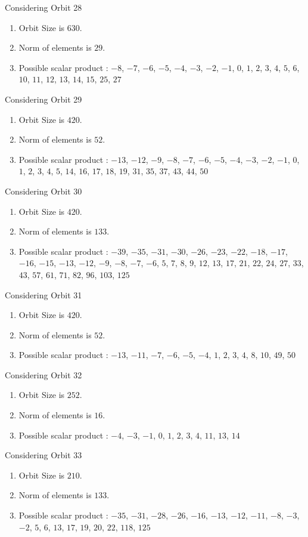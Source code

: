 \documentclass[12pt]{article}
\begin{document}
Considering Orbit 28
\begin{enumerate}
\item Orbit Size is $630$.
\item Norm of elements is $29$.
\item Possible scalar product : $-8$, $-7$, $-6$, $-5$, $-4$, $-3$, $-2$, $-1$, $0$, $1$, $2$, $3$, $4$, $5$, $6$, $10$, $11$, $12$, $13$, $14$, $15$, $25$, $27$
\end{enumerate}
Considering Orbit 29
\begin{enumerate}
\item Orbit Size is $420$.
\item Norm of elements is $52$.
\item Possible scalar product : $-13$, $-12$, $-9$, $-8$, $-7$, $-6$, $-5$, $-4$, $-3$, $-2$, $-1$, $0$, $1$, $2$, $3$, $4$, $5$, $14$, $16$, $17$, $18$, $19$, $31$, $35$, $37$, $43$, $44$, $50$
\end{enumerate}
Considering Orbit 30
\begin{enumerate}
\item Orbit Size is $420$.
\item Norm of elements is $133$.
\item Possible scalar product : $-39$, $-35$, $-31$, $-30$, $-26$, $-23$, $-22$, $-18$, $-17$, $-16$, $-15$, $-13$, $-12$, $-9$, $-8$, $-7$, $-6$, $5$, $7$, $8$, $9$, $12$, $13$, $17$, $21$, $22$, $24$, $27$, $33$, $43$, $57$, $61$, $71$, $82$, $96$, $103$, $125$
\end{enumerate}
Considering Orbit 31
\begin{enumerate}
\item Orbit Size is $420$.
\item Norm of elements is $52$.
\item Possible scalar product : $-13$, $-11$, $-7$, $-6$, $-5$, $-4$, $1$, $2$, $3$, $4$, $8$, $10$, $49$, $50$
\end{enumerate}
Considering Orbit 32
\begin{enumerate}
\item Orbit Size is $252$.
\item Norm of elements is $16$.
\item Possible scalar product : $-4$, $-3$, $-1$, $0$, $1$, $2$, $3$, $4$, $11$, $13$, $14$
\end{enumerate}
Considering Orbit 33
\begin{enumerate}
\item Orbit Size is $210$.
\item Norm of elements is $133$.
\item Possible scalar product : $-35$, $-31$, $-28$, $-26$, $-16$, $-13$, $-12$, $-11$, $-8$, $-3$, $-2$, $5$, $6$, $13$, $17$, $19$, $20$, $22$, $118$, $125$
\end{enumerate}
\end{document}
